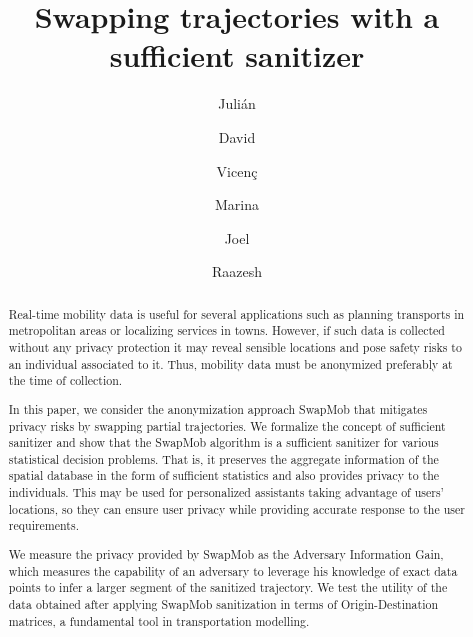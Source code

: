 \documentclass[times,twocolumn,final,authoryear]{elsarticle}
\begin{document}
\begin{frontmatter}

\title{Swapping trajectories with a sufficient sanitizer}


\author[1,2]{Juli\'an } 

\author[1,2]{David }
\author[3,4]{Vicen\c{c}  }
\author[5]{Marina  }
\author[6]{Joel  }
\author[6,7]{Raazesh  }

\address[1]{Internet Interdisciplinary Institute (IN3), Universitat Oberta de Catalunya (UOC), Barcelona, Spain.
}
\address[2]{CYBERCAT-Center for Cybersecurity Research 
of Catalonia, Barcelona, Spain.}
\address[3]{Hamilton Institute, Maynooth University, Maynooth, Ireland.}
\address[4]{School of Informatics, University of Sk\"{o}vde, Sk\"{o}vde, Sweden.}
\address[5]{Department of Economic and Cultural Geography, Uppsala University, Uppsala, Sweden.}
\address[6]{Department of Mathematics, Uppsala University, Uppsala, Sweden.}
\address[7]{Combient Competence Centre for Data Engineering Sciences, Uppsala University, Sweden.}

\begin{abstract}

Real-time mobility data is useful for several applications such as planning transports in metropolitan areas or localizing services in towns. However, if such data is collected without any privacy protection it may reveal sensible locations and pose safety risks to an individual associated to it.
Thus, mobility data must be anonymized preferably at the time of collection.

In this paper, we consider the anonymization approach SwapMob that mitigates privacy risks by swapping partial trajectories. We formalize the concept of sufficient sanitizer and show that the SwapMob algorithm is a sufficient sanitizer for various statistical decision problems. That is, it preserves the aggregate information of the spatial database in the form of sufficient statistics and also provides privacy to the individuals. 
This may be used for personalized assistants taking advantage of users' locations, so they can ensure user privacy while providing accurate response to the user requirements.

We measure the privacy provided by SwapMob as the Adversary Information Gain, which measures the capability of an adversary to leverage his knowledge of exact data points to infer a larger segment of the sanitized trajectory. 
We test the utility of the data obtained after applying SwapMob sanitization in terms of Origin-Destination matrices, a fundamental tool in  transportation modelling.



\end{abstract}
\end{frontmatter}
\end{document}
